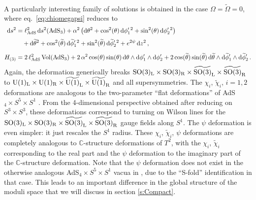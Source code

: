 \documentclass[a4paper, 11pt]{article}
\numberwithin{equation}{section}
\newcommand{\ts}[1]{\widetilde{#1}}
\newcommand{\SO}[1]{\mathrm{SO}( #1 )}
\newcommand{\+}{\oplus}
\renewcommand{\d}{\ensuremath{\mathrm{d}}\xspace}
\begin{document}
\paragraph{}
A particularly interesting family of solutions is obtained in the case $\Omega=\ts{\Omega}=0$, where eq.~\eqref{eq:chiomegapsi} reduces to
\begin{equation} \label{eq:chipsi}
	\begin{split}
		\d s^{2} &= \ell_{\rm AdS}^{2} \,\d s^{2}({\rm AdS}_{3}) +\alpha^{2}\left(\d\theta^{2} + \cos^{2}(\theta)\,\d\phi'_{1}{}^{2} + \sin^{2}(\theta)\,\d\phi'_{2}{}^{2} \right) \\[3pt]
		&\quad +\d\ts{\theta}^{2} + \cos^{2}(\ts{\theta})\,\d\ts{\phi}'_{1}{}^{2} + \sin^{2}(\ts{\theta})\,\d\ts{\phi}'_{2}{}^{2} + e^{2\psi}\,\d z^{2}\,, \\[5pt]
		H_{(3)} &= 2\,\ell_{\rm AdS}^{2}\,{\rm Vol}({\rm AdS_{3}}) + 2\,\alpha^{2}\cos(\theta)\sin(\theta)\,\d\theta\wedge\d\phi'_{1}\wedge\d\phi'_{2}+ 2\cos(\ts{\theta})\sin(\ts{\theta})\,\d\ts{\theta}\wedge\d\ts{\phi}'_{1}\wedge\d\ts{\phi}'_{2}\,.
	\end{split}
\end{equation}
Again, the deformation generically breaks $\SO{3}_{\rm L}\times\SO{3}_{\rm R}\times\ts{\SO{3}}_{\rm L}\times\ts{\SO{3}}_{\rm R}$ to ${\rm U}(1)_{\rm L}\times{\rm U}(1)_{\rm R}\times\ts{{\rm U}(1)}_{\rm L}\times\ts{{\rm U}(1)}_{\rm R}$ and all supersymmetries. The $\chi_i$, $\ts{\chi}_i$, $i = 1, 2$ deformations are analogous to the two-parameter ``flat deformations'' \cite{Guarino:2021hrc} of AdS$_4 \times S^5 \times S^1$ \cite{Guarino:2020gfe,Giambrone:2021zvp,Giambrone:2021wsm}. From the 4-dimensional perspective obtained after reducing on $S^3 \times S^3$, these deformations correspond to turning on Wilson lines for the $\SO{3}_{\rm L}\times\SO{3}_{\rm R}\times\ts{\SO{3}}_{\rm L}\times\ts{\SO{3}}_{\rm R}$ gauge fields along $S^1$. The $\psi$ deformation is even simpler: it just rescales the $S^1$ radius. These $\chi_i$, $\ts{\chi}_i$, $\psi$ deformations are completely analogous to $\mathbb{C}$-structure deformations of $T^2$, with the $\chi_i$, $\ts{\chi}_i$ corresponding to the real part and the $\psi$ deformation to the imaginary part of the $\mathbb{C}$-structure deformation. Note that the $\psi$ deformation does not exist in the otherwise analogous AdS$_4 \times S^5 \times S^1$ vacua in \cite{Guarino:2020gfe,Guarino:2021hrc,Giambrone:2021zvp,Giambrone:2021wsm}, due to the ``S-fold'' identification in that case. This leads to an important difference in the global structure of the moduli space that we will discuss in section \ref{s:Compact}.
\end{document}
